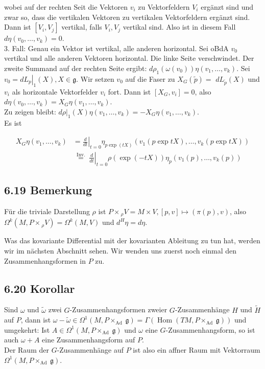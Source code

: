 \documentclass[10pt, letterpaper]{article}
\begin{document}
wobei auf der rechten Seit die Vektoren $v_{i}$ zu Vektorfeldern $V_{i}$ ergänzt sind und zwar so, dass die vertikalen Vektoren zu vertikalen Vektorfeldern ergänzt sind. Dann ist $\left[V_{i}, V_{j}\right]$ vertikal, falls $V_{i}, V_{j}$ vertikal sind. Also ist in diesem Fall $d \eta\left(v_{0}, \ldots, v_{k}\right)=0$.\\
3. Fall: Genau ein Vektor ist vertikal, alle anderen horizontal. Sei oBdA $v_{0}$ vertikal und alle anderen Vektoren horizontal. Die linke Seite verschwindet. Der zweite Summand auf der rechten Seite ergibt: $d \rho_{1}\left(\omega\left(v_{0}\right)\right) \eta\left(v_{1}, \ldots, v_{k}\right)$. Sei $v_{0}=\left.d L_{p}\right|_{1}(X), X \in \mathfrak{g}$. Wir setzen $v_{0}$ auf die Faser zu $X_{G}(\tilde{p})=$ $d L_{\tilde{p}}(X)$ und $v_{i}$ als horizontale Vektorfelder $v_{i}$ fort. Dann ist $\left[X_{G}, v_{i}\right]=0$, also $d \eta\left(v_{0}, \ldots, v_{k}\right)=X_{G} \eta\left(v_{1}, \ldots, v_{k}\right)$.\\
Zu zeigen bleibt: $\left.d \rho\right|_{1}(X) \eta\left(v_{1}, \ldots, v_{k}\right)=-X_{G} \eta\left(v_{1}, \ldots, v_{k}\right)$.\\
Es ist

$$
\begin{aligned}
X_{G} \eta\left(v_{1}, \ldots, v_{k}\right) & =\left.\frac{d}{d t}\right|_{t=0} \eta_{p \exp (t X)}\left(v_{1}(p \exp t X), \ldots, v_{k}(p \exp t X)\right) \\
& \left.\stackrel{\text { Inv. }}{=} \frac{d}{d t}\right|_{t=0} \rho(\exp (-t X)) \eta_{p}\left(v_{1}(p), \ldots, v_{k}(p)\right)
\end{aligned}
$$

\subsection*{6.19 Bemerkung}
Für die triviale Darstellung $\rho$ ist $P \times{ }_{\rho} V=M \times V,[p, v] \mapsto(\pi(p), v)$, also $\Omega^{k}\left(M, P \times{ }_{\rho} V\right)=\Omega^{k}(M, V)$ und $d^{H} \eta=d \eta$.

Was das kovariante Differential mit der kovarianten Ableitung zu tun hat, werden wir im nächsten Abschnitt sehen. Wir wenden uns zuerst noch einmal den Zusammenhangsformen in $P$ zu.

\subsection*{6.20 Korollar}
Sind $\omega$ und $\tilde{\omega}$ zwei $G$-Zusammenhangsformen zweier $G$-Zusammenhänge $H$ und $\tilde{H}$ auf $P$, dann ist $\omega-\tilde{\omega} \in \Omega^{1}\left(M, P \times_{\text {Ad }} \mathfrak{g}\right)=\Gamma\left(\operatorname{Hom}\left(T M, P \times_{\text {Ad }} \mathfrak{g}\right)\right)$ und umgekehrt: Ist $A \in \Omega^{1}\left(M, P \times_{\text {Ad }} \mathfrak{g}\right)$ und $\omega$ eine $G$-Zusammenhangsform, so ist auch $\omega+A$ eine Zusammenhangsform auf $P$.\\
Der Raum der $G$-Zusammenhänge auf $P$ ist also ein affner Raum mit Vektorraum $\Omega^{1}\left(M, P \times_{\text {Ad }} \mathfrak{g}\right)$.
\end{document}
